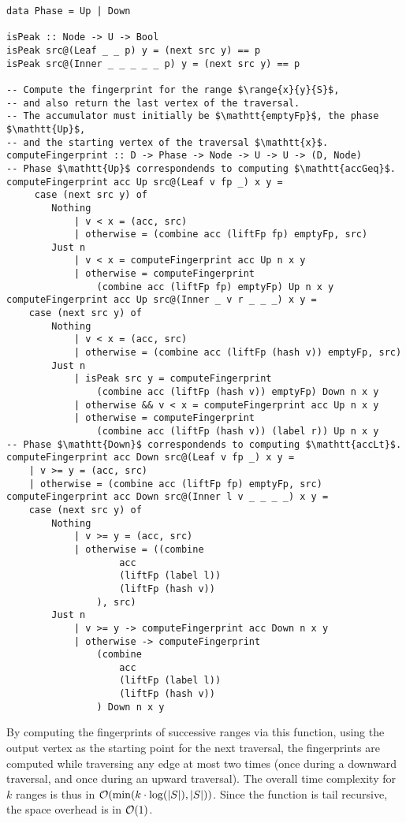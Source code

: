 \begin{verbatim}
data Phase = Up | Down

isPeak :: Node -> U -> Bool
isPeak src@(Leaf _ _ p) y = (next src y) == p
isPeak src@(Inner _ _ _ _ _ p) y = (next src y) == p

-- Compute the fingerprint for the range $\range{x}{y}{S}$,
-- and also return the last vertex of the traversal.
-- The accumulator must initially be $\mathtt{emptyFp}$, the phase $\mathtt{Up}$,
-- and the starting vertex of the traversal $\mathtt{x}$.
computeFingerprint :: D -> Phase -> Node -> U -> U -> (D, Node)
-- Phase $\mathtt{Up}$ correspondends to computing $\mathtt{accGeq}$.
computeFingerprint acc Up src@(Leaf v fp _) x y =
     case (next src y) of
        Nothing
            | v < x = (acc, src)
            | otherwise = (combine acc (liftFp fp) emptyFp, src)
        Just n
            | v < x = computeFingerprint acc Up n x y
            | otherwise = computeFingerprint
                (combine acc (liftFp fp) emptyFp) Up n x y
computeFingerprint acc Up src@(Inner _ v r _ _ _) x y =
    case (next src y) of
        Nothing
            | v < x = (acc, src)
            | otherwise = (combine acc (liftFp (hash v)) emptyFp, src)
        Just n
            | isPeak src y = computeFingerprint
                (combine acc (liftFp (hash v)) emptyFp) Down n x y
            | otherwise && v < x = computeFingerprint acc Up n x y
            | otherwise = computeFingerprint
                (combine acc (liftFp (hash v)) (label r)) Up n x y
-- Phase $\mathtt{Down}$ correspondends to computing $\mathtt{accLt}$.
computeFingerprint acc Down src@(Leaf v fp _) x y =
    | v >= y = (acc, src)
    | otherwise = (combine acc (liftFp fp) emptyFp, src)
computeFingerprint acc Down src@(Inner l v _ _ _ _) x y =
    case (next src y) of
        Nothing
            | v >= y = (acc, src)
            | otherwise = ((combine
                    acc
                    (liftFp (label l))
                    (liftFp (hash v))
                ), src)
        Just n
            | v >= y -> computeFingerprint acc Down n x y
            | otherwise -> computeFingerprint
                (combine
                    acc
                    (liftFp (label l))
                    (liftFp (hash v))
                ) Down n x y
\end{verbatim}

By computing the fingerprints of successive ranges via this function, using the output vertex as the starting point for the next traversal, the fingerprints are computed while traversing any edge at most two times (once during a downward traversal, and once during an upward traversal). The overall time complexity for $k$ ranges is thus in $\mathcal{O}(\min(k \cdot \log(|{S}|), |{S}|))$. Since the function is tail recursive, the space overhead is in $\mathcal{O}(1)$.

